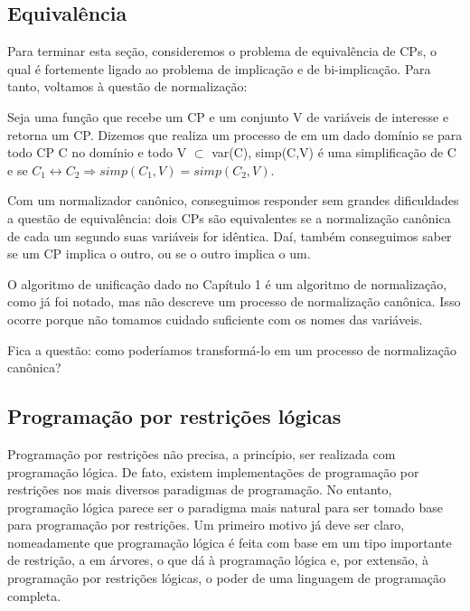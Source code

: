 \documentclass{article}
\begin{document}
\subsection{Equivalência}

  Para terminar esta seção, consideremos o problema de equivalência de CPs, o qual é fortemente ligado ao problema de implicação e de bi-implicação. Para tanto, voltamos à questão de normalização:

\begin{definition}
    Seja  uma função que recebe um CP e um conjunto V de variáveis de interesse e retorna um CP. Dizemos que  realiza um processo de  em um dado domínio se para todo CP C no domínio e todo V $\subset$ var(C), simp(C,V) é uma simplificação de C e se $C_1 \leftrightarrow C_2 \Rightarrow simp(C_1,V) = simp(C_2,V)$.
\end{definition}

  Com um normalizador canônico, conseguimos responder sem grandes dificuldades a questão de equivalência: dois CPs são equivalentes se a normalização canônica de cada um segundo suas variáveis for idêntica. Daí, também conseguimos saber se um CP implica o outro, ou se o outro implica o um.

  O algoritmo de unificação dado no Capítulo 1 %
é um algoritmo de normalização, como já foi notado, mas não descreve um processo de normalização canônica. Isso ocorre porque não tomamos cuidado suficiente com os nomes das variáveis.

Fica a questão: como poderíamos transformá-lo em um processo de normalização canônica?

\subsection{Programação por restrições lógicas}

Programação por restrições não precisa, a princípio, ser realizada com programação lógica. De fato, existem implementações de
programação por restrições nos mais diversos paradigmas de programação. No entanto, programação lógica parece ser o paradigma mais natural
para ser tomado base para programação por restrições. Um primeiro motivo já deve ser claro, nomeadamente que programação lógica é feita com base em um tipo importante de restrição, a em árvores, o que dá à programação lógica e, por extensão, à programação
por restrições lógicas, o poder de uma linguagem de programação completa.
\end{document}
